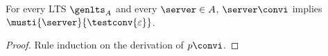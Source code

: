 \begin{lemma}
  \label{lem:terminate-must-gen-conv-nil}
  For every LTS $\genlts_{\States}$ and
  every $\server \in \States$,
  $\server \convi$ implies $\musti{\server}{\testconv{\varepsilon}}$.
\end{lemma}
\begin{proof}
Rule induction on the derivation of $p \convi$.
%
%
\end{proof}


